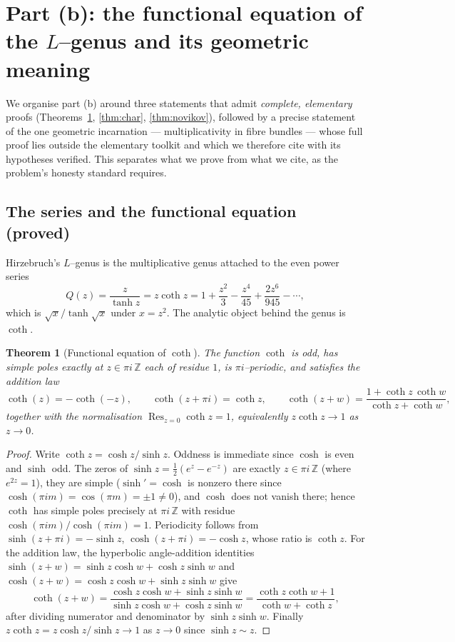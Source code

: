 \documentclass[12pt]{article}
\newtheorem{theorem}{Theorem}
\theoremstyle{definition}
\begin{document}
\bigskip

\section{Part (b): the functional equation of the $L$--genus and its geometric
meaning}\label{sec:partb}

We organise part (b) around three statements that admit \emph{complete, elementary}
proofs (Theorems~\ref{thm:funeq}, \ref{thm:char}, \ref{thm:novikov}), followed by a
precise statement of the one geometric incarnation --- multiplicativity in fibre bundles
--- whose full proof lies outside the elementary toolkit and which we therefore cite with
its hypotheses verified. This separates what we prove from what we cite, as the problem's
honesty standard requires.

\subsection*{The series and the functional equation (proved)}

Hirzebruch's $L$--genus is the multiplicative genus attached to the even power series
\[
Q(z)=\frac{z}{\tanh z}=z\coth z
=1+\frac{z^2}{3}-\frac{z^4}{45}+\frac{2z^6}{945}-\cdots ,
\tag{10}\label{eq:Qseries}
\]
which is $\sqrt{x}/\tanh\sqrt{x}$ under $x=z^2$. The analytic object behind the genus is
$\coth$.

\begin{theorem}[Functional equation of $\coth$]\label{thm:funeq}
The function $\coth$ is odd, has simple poles exactly at $z\in\pi i\,\mathbb Z$ each of
residue $1$, is $\pi i$--periodic, and satisfies the addition law
\[
\coth(z)=-\coth(-z),\qquad
\coth(z+\pi i)=\coth z,\qquad
\coth(z+w)=\frac{1+\coth z\,\coth w}{\coth z+\coth w},
\tag{11}\label{eq:funeq}
\]
together with the normalisation $\operatorname{Res}_{z=0}\coth z=1$, equivalently
$z\coth z\to 1$ as $z\to 0$.
\end{theorem}

\begin{proof}
Write $\coth z=\cosh z/\sinh z$. Oddness is immediate since $\cosh$ is even and $\sinh$
odd. The zeros of $\sinh z=\tfrac12(e^z-e^{-z})$ are exactly $z\in\pi i\,\mathbb Z$
(where $e^{2z}=1$), they are simple ($\sinh'=\cosh$ is nonzero there since
$\cosh(\pi i m)=\cos(\pi m)=\pm1\ne0$), and $\cosh$ does not vanish there; hence $\coth$
has simple poles precisely at $\pi i\,\mathbb Z$ with residue
$\cosh(\pi i m)/\cosh(\pi i m)=1$. Periodicity follows from
$\sinh(z+\pi i)=-\sinh z$, $\cosh(z+\pi i)=-\cosh z$, whose ratio is $\coth z$. For the
addition law, the hyperbolic angle-addition identities
$\sinh(z+w)=\sinh z\cosh w+\cosh z\sinh w$ and
$\cosh(z+w)=\cosh z\cosh w+\sinh z\sinh w$ give
\[
\coth(z+w)
=\frac{\cosh z\cosh w+\sinh z\sinh w}{\sinh z\cosh w+\cosh z\sinh w}
=\frac{\coth z\coth w+1}{\coth w+\coth z},
\]
after dividing numerator and denominator by $\sinh z\sinh w$. Finally
$z\coth z=z\cosh z/\sinh z\to 1$ as $z\to0$ since $\sinh z\sim z$.
\end{proof}
\end{document}

